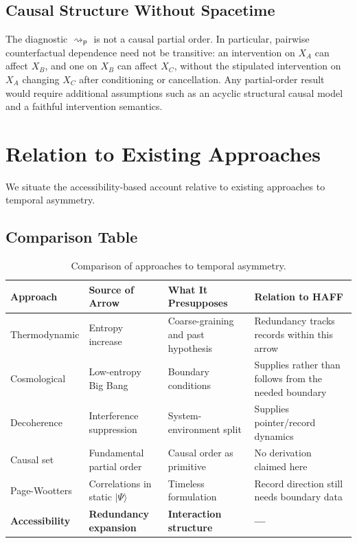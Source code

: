 \documentclass[12pt,a4paper,openany]{book}
\begin{document}
\subsection{Causal Structure Without Spacetime}

The diagnostic $\rightsquigarrow_{\mathsf P}$ is not a causal partial order.  In particular, pairwise counterfactual dependence need not be transitive: an intervention on $X_A$ can affect $X_B$, and one on $X_B$ can affect $X_C$, without the stipulated intervention on $X_A$ changing $X_C$ after conditioning or cancellation.  Any partial-order result would require additional assumptions such as an acyclic structural causal model and a faithful intervention semantics.

\section{Relation to Existing Approaches}
\label{H-F-sec:relations}

We situate the accessibility-based account relative to existing approaches to temporal asymmetry.

\subsection{Comparison Table}

\begin{table}[ht]
\centering
\small
\begin{tabular}{|P{2.8cm}|P{3.5cm}|P{3.5cm}|P{3cm}|}
\hline
\textbf{Approach} & \textbf{Source of Arrow} & \textbf{What It Presupposes} & \textbf{Relation to HAFF} \\
\hline
Thermodynamic & Entropy increase & Coarse-graining and past hypothesis & Redundancy tracks records within this arrow \\
\hline
Cosmological & Low-entropy Big Bang & Boundary conditions & Supplies rather than follows from the needed boundary \\
\hline
Decoherence & Interference suppression & System-environment split & Supplies pointer/record dynamics \\
\hline
Causal set & Fundamental partial order & Causal order as primitive & No derivation claimed here \\
\hline
Page-Wootters & Correlations in static $|\Psi\rangle$ & Timeless formulation & Record direction still needs boundary data \\
\hline
\textbf{Accessibility} & \textbf{Redundancy expansion} & \textbf{Interaction structure} & \textbf{---} \\
\hline
\end{tabular}
\caption{Comparison of approaches to temporal asymmetry.}
\label{H-F-tab:comparison}
\end{table}
\end{document}

